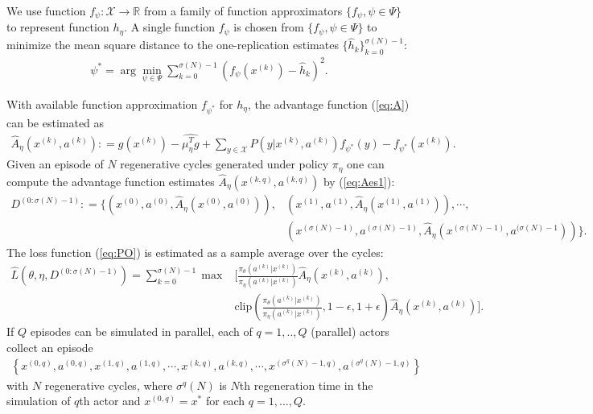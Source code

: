 \documentclass[11pt]{article}
\newcommand{\R}{\mathbb{R}}
\newcommand{\X}{\mathcal{X}}
\theoremstyle{definition}
\numberwithin{equation}{section}
\begin{document}
We use   function $f_\psi:\X\rightarrow \R$ from  a family of function approximators $\{f_\psi, \psi\in \Psi \}$ to represent function $h_{  \eta}$.    A single function $f_\psi$  is chosen from $\{f_\psi, \psi\in \Psi \}$ to minimize the mean square distance to the one-replication estimates  $\{\hat  h_k\}_{k=0}^{\sigma(N)-1}:$
\begin{align}\label{eq:Vappr}
\psi^* = \arg\min\limits_{\psi \in \Psi} \sum\limits_{k=0}^{\sigma(N)-1} \left ( f_{\psi}(x^{(k)}) - \hat h_k   \right)^2.
\end{align}



With available function approximation $f_{\psi^*}$ for $h_\eta$, the advantage function (\ref{eq:A}) can be estimated as
 \begin{align}\label{eq:Aes1}
 	\hat A_{\eta}(x^{(k)}, a^{(k)}): =   g(x^{(k)}) - \widehat{\mu_\eta^T g} + \sum\limits_{y\in \X} P\left(y|x^{(k)}, a^{(k)}\right) f_{\psi^*} (y) -  f_{\psi^*}(x^{(k)}).
 \end{align}
 Given an episode of $N$ regenerative cycles generated under policy $\pi_\eta$  one can compute  the advantage function estimates $\hat A_{\eta}(x^{(k, q)}, a^{(k, q)})$   by (\ref{eq:Aes1}):
\begin{align*}
D^{(0:\sigma(N)-1)}: = \Big \{\left(x^{(0)}, a^{(0)}, \hat A_{\eta}(x^{(0)}, a^{(0)})\right),& \left (x^{(1)}, a^{(1)}, \hat A_{\eta}(x^{(1)}, a^{(1)})\right),\cdots,\\
& \left(x^{(\sigma(N)-1)}, a^{(\sigma(N)-1)}, \hat A_{\eta}(x^{(\sigma(N)-1)}, a^{(\sigma(N)-1}) \right)\Big\}.
   \end{align*}
   The loss function (\ref{eq:PO}) is estimated as a sample average over the cycles:
 \begin{align}\label{eq:popt}
   \hat L\left(\theta, \eta,D^{(0:\sigma(N)-1)} \right) = \sum\limits_{k=0}^{\sigma(N)-1} \max&\Big[ \frac{\pi_{\theta}\left(a^{(k)}| x^{(k)}\right)}{\pi_{\eta}\left(a^{(k)}|x^{(k)}\right)}  \hat A_{\eta}(x^{(k)}, a^{(k)}) ,\\
   &\text{clip}\left(\frac{\pi_{\theta}\left(a^{(k)}| x^{(k)}\right)}{\pi_{\eta}\left(a^{(k)}|x^{(k)}\right)},     1-\epsilon, 1+\epsilon \right  ) \hat  A_{\eta}(x^{(k)}, a^{(k)})  \Big].\nonumber
   \end{align}
If $Q$ episodes can be simulated in parallel, each of $q=1, .., Q$ (parallel) actors collect an episode
\begin{align*}
\left\{x^{(0, q)}, a^{(0, q)}, x^{(1 , q)}, a^{(1, q)}, \cdots, x^{(k , q)}, a^{(k, q)},\cdots, x^{(\sigma^q(N)-1, q)}, a^{(\sigma^q(N)-1, q)}\right\}
\end{align*}
with $N$ regenerative cycles, where $\sigma^q(N)$  is $N$th regeneration time in the simulation of $q$th actor and $x^{(0, q)} = x^*$ for each $q=1, ..., Q$.
\end{document}
